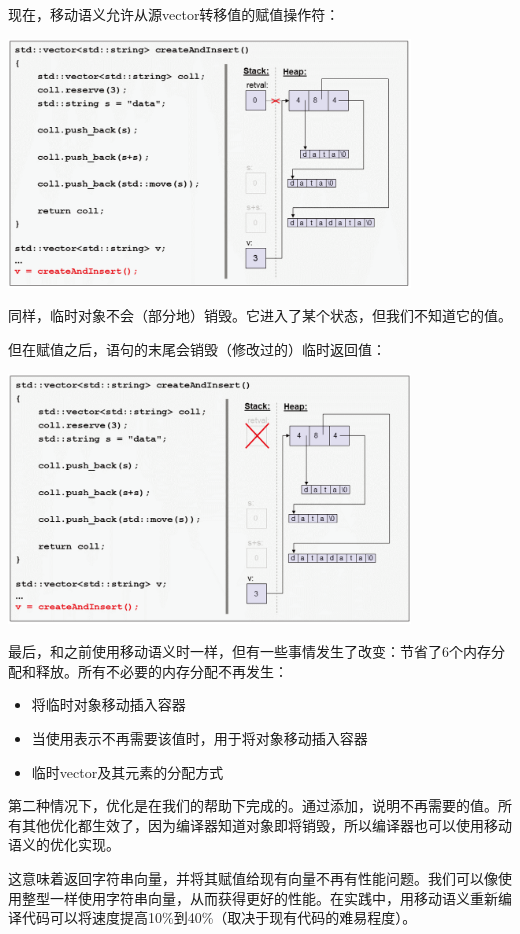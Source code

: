 \begin{itemize}
	现在，移动语义允许从源vector转移值的赋值操作符：
\begin{center}
		\includegraphics[width=0.8\textwidth]{part1/ch1/images/16}
	\end{center}
	同样，临时对象不会（部分地）销毁。它进入了某个状态，但我们不知道它的值。

	但在赋值之后，语句的末尾会销毁（修改过的）临时返回值：
\begin{center}
		\includegraphics[width=0.8\textwidth]{part1/ch1/images/17}
	\end{center}
\end{itemize}

最后，和之前使用移动语义时一样，但有一些事情发生了改变：节省了6个内存分配和释放。所有不必要的内存分配不再发生：

\begin{itemize}
	\item 将临时对象移动插入容器
	\item 当使用表示不再需要该值时，用于将对象移动插入容器
	\item 临时vector及其元素的分配方式
\end{itemize}

第二种情况下，优化是在我们的帮助下完成的。通过添加，说明不再需要的值。所有其他优化都生效了，因为编译器知道对象即将销毁，所以编译器也可以使用移动语义的优化实现。

这意味着返回字符串向量，并将其赋值给现有向量不再有性能问题。我们可以像使用整型一样使用字符串向量，从而获得更好的性能。在实践中，用移动语义重新编译代码可以将速度提高10\%到40\%（取决于现有代码的难易程度）。


























